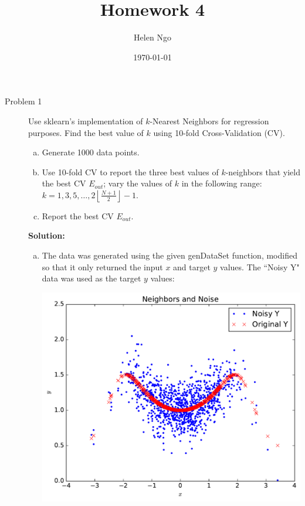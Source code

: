 \documentclass[a4paper]{article}
\title{Homework 4}
\author{Helen Ngo}
\date{\today}
\begin{document}
\lstset{language=Python,basicstyle=\ttfamily\footnotesize}

\maketitle

\begin {description}

\item[Problem 1] Use sklearn's implementation of $k$-Nearest Neighbors for regression purposes. Find the best value of $k$ using 10-fold Cross-Validation (CV).

\begin{enumerate}[(a)]
\item Generate 1000 data points.
\item Use 10-fold CV to report the three best values of $k$-neighbors that yield the best CV $E_{out}$; vary the values of $k$ in the following range: $k = 1, 3, 5, \dots, 2 \left \lfloor \frac{N+1}{2} \right \rfloor-1$.
\item Report the best CV $E_{out}$.
\end{enumerate}

\smallskip

\textbf{Solution:}
\begin{doublespace}
\begin{enumerate}[(a)]
\item The data was generated using the given genDataSet function, modified so that it only returned the input $x$ and target $y$ values. The ``Noisy Y" data was used as the target $y$ values:

\begin{center}
\includegraphics[scale=0.75]{neighbors.pdf}
\end{center}


\end{enumerate}
\end{doublespace}
\end{description}
\end{document}
